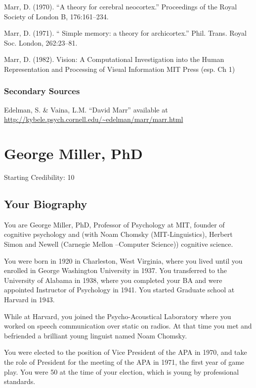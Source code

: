 \begin{refsection}
Marr, D. (1970). “A theory for cerebral neocortex.” Proceedings of the Royal Society of London B, 176:161--234.

Marr, D. (1971). “ Simple memory: a theory for archicortex.” Phil. Trans. Royal Soc. London, 262:23--81.

Marr, D. (1982). Vision: A Computational Investigation into the Human Representation and Processing of Visual Information MIT Press (esp. Ch 1)

\subsection{Secondary Sources}
\label{secondarysources}

Edelman, S. \& Vaina, L.M. “David Marr” available at \url{http://kybele.psych.cornell.edu/~edelman/marr/marr.html}

\chapter{George Miller, PhD}
\label{georgemillerphd}

Starting Credibility: 10

\section{Your Biography}
\label{yourbiography}

You are George Miller, PhD, Professor of Psychology at MIT, founder of cognitive psychology and (with Noam Chomsky (MIT-Linguistics), Herbert Simon and Newell (Carnegie Mellon –Computer Science)) cognitive science.

You were born in 1920 in Charleston, West Virginia, where you lived until you enrolled in George Washington University in 1937. You transferred to the University of Alabama in 1938, where you completed your BA and were appointed Instructor of Psychology in 1941. You started Graduate school at Harvard in 1943.

While at Harvard, you joined the Psycho-Acoustical Laboratory where you worked on speech communication over static on radios. At that time you met and befriended a brilliant young linguist named Noam Chomsky.

You were elected to the position of Vice President of the APA in 1970, and take the role of President for the meeting of the APA in 1971, the first year of game play. You were 50 at the time of your election, which is young by professional standards.


\end{refsection}
